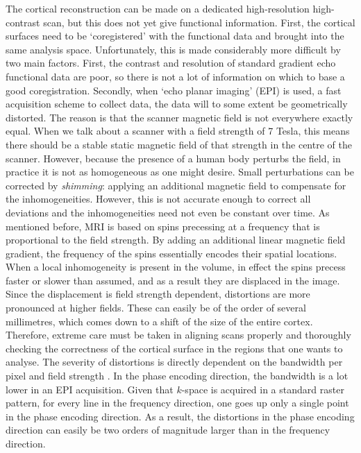 The cortical reconstruction can be made on a dedicated high-resolution high-contrast scan, but this does not yet give functional information. First, the cortical surfaces need to be `coregistered' with the functional data and brought into the same analysis space. Unfortunately, this is made considerably more difficult by two main factors. First, the contrast and resolution of standard gradient echo functional data are poor, so there is not a lot of information on which to base a good coregistration. Secondly, when `echo planar imaging' (EPI) is used, a fast acquisition scheme to collect data, the data will to some extent be geometrically distorted. The reason is that the scanner magnetic field is not everywhere exactly equal. When we talk about a scanner with a field strength of 7 Tesla, this means there should be a stable static magnetic field of that strength in the centre of the scanner. However, because the presence of a human body perturbs the field, in practice it is not as homogeneous as one might desire. Small perturbations can be corrected by \emph{shimming}: applying an additional magnetic field to compensate for the inhomogeneities. However, this is not accurate enough to correct all deviations and the inhomogeneities need not even be constant over time. As mentioned before, MRI is based on spins precessing at a frequency that is proportional to the field strength. By adding an additional linear magnetic field gradient, the frequency of the spins essentially encodes their spatial locations.  When a local inhomogeneity is present in the volume, in effect the spins precess faster or slower than assumed, and as a result they are displaced in the image. Since the displacement is field strength dependent, distortions are more pronounced at higher fields. These can easily be of the order of several millimetres, which comes down to a shift of the size of the entire cortex. Therefore, extreme care must be taken in aligning scans properly and thoroughly checking the correctness of the cortical surface in the regions that one wants to analyse. The severity of distortions is directly dependent on the bandwidth per pixel and field strength \cite{Jezzard1995,Schmitt1998}. In the phase encoding direction, the bandwidth is a lot lower in an EPI acquisition. Given that $k$-space is acquired in a standard raster pattern, for every line in the frequency direction, one goes up only a single point in the phase encoding direction. As a result, the distortions in the phase encoding direction can easily be two orders of magnitude larger than in the frequency direction.


